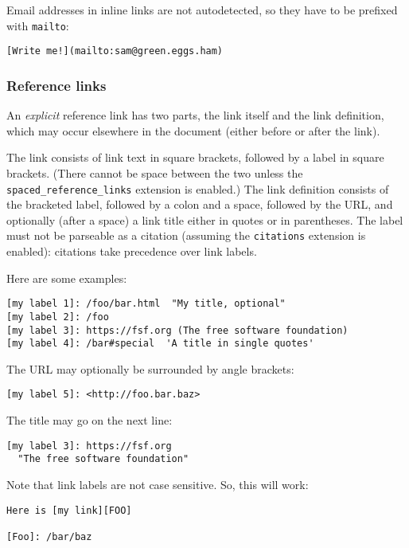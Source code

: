 \documentclass[]{article}
\begin{document}
Email addresses in inline links are not autodetected, so they have to be
prefixed with \texttt{mailto}:

\begin{verbatim}
[Write me!](mailto:sam@green.eggs.ham)
\end{verbatim}

\hypertarget{reference-links}{%
\subsubsection{Reference links}\label{reference-links}}

An \emph{explicit} reference link has two parts, the link itself and the
link definition, which may occur elsewhere in the document (either
before or after the link).

The link consists of link text in square brackets, followed by a label
in square brackets. (There cannot be space between the two unless the
\texttt{spaced\_reference\_links} extension is enabled.) The link
definition consists of the bracketed label, followed by a colon and a
space, followed by the URL, and optionally (after a space) a link title
either in quotes or in parentheses. The label must not be parseable as a
citation (assuming the \texttt{citations} extension is enabled):
citations take precedence over link labels.

Here are some examples:

\begin{verbatim}
[my label 1]: /foo/bar.html  "My title, optional"
[my label 2]: /foo
[my label 3]: https://fsf.org (The free software foundation)
[my label 4]: /bar#special  'A title in single quotes'
\end{verbatim}

The URL may optionally be surrounded by angle brackets:

\begin{verbatim}
[my label 5]: <http://foo.bar.baz>
\end{verbatim}

The title may go on the next line:

\begin{verbatim}
[my label 3]: https://fsf.org
  "The free software foundation"
\end{verbatim}

Note that link labels are not case sensitive. So, this will work:

\begin{verbatim}
Here is [my link][FOO]

[Foo]: /bar/baz
\end{verbatim}
\end{document}
